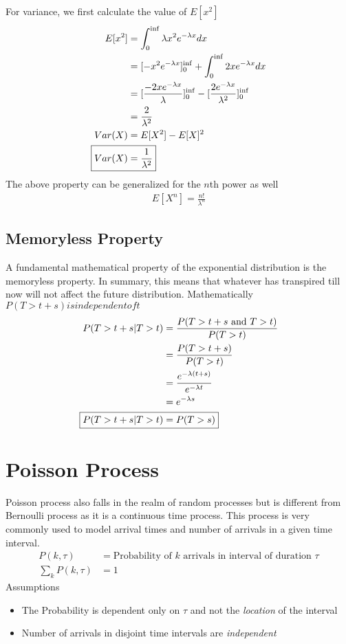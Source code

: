 \documentclass[../probability-notes.tex]{subfiles}
\begin{document}
    For variance, we first calculate the value of $E[x^{2}]$
    \begin{align*}
        E[x^{2}] &= \int_{0}^{\inf} \lambda x^{2} e^{-\lambda x} dx\\
        &= [-x^{2} e^{-\lambda x}]_{0}^{\inf} + \int_{0}^{\inf} 2x e^{-\lambda x} dx\\
        &= [\frac{-2x e^{-\lambda x}}{\lambda}]_{0}^{\inf} - [\frac{2e^{-\lambda x}}{\lambda^{2}}]_{0}^{\inf}\\
        &= \frac{2}{\lambda^{2}}\\
        Var(X) &= E[X^{2}] - E[X]^{2}\\
        \Aboxed{Var(X) &= \frac{1}{\lambda^{2}}}
    \end{align*}
    The above property can be generalized for the $n$th power as well
    \begin{align*}
        E[X^{n}] = \frac{n!}{\lambda^{n}}
    \end{align*}

    \subsection{Memoryless Property}
    A fundamental mathematical property of the exponential distribution is the memoryless property. In summary, this means that whatever has transpired till now will not affect the future distribution. Mathematically $P(T > t+s) is independent of t$
    \begin{align*}
        P(T > t+s | T>t) &= \frac{P(T> t+s \text{ and }T > t)}{P(T > t)}\\
        &= \frac{P(T > t + s)}{P(T > t)}\\
        &= \frac{e^{-\lambda(t+s)}}{e^{-\lambda t}}\\
        &= e^{-\lambda s}\\
        \Aboxed{P(T > t+s | T>t) &= P(T > s)}
    \end{align*}


    \section{Poisson Process}
    Poisson process also falls in the realm of random processes but is different from Bernoulli process as it is a continuous time process. This process is very commonly used to model arrival times and number of arrivals in a given time interval.
    \begin{align*}
        P(k, \tau) &= \text{Probability of $k$ arrivals in interval of duration $\tau$}\\
        \sum_{k} P(k, \tau) &= 1 \tag*{for a given $\tau$}
    \end{align*}
    Assumptions
    \begin{itemize}
        \item The Probability is dependent only on $\tau$ and not the \emph{location} of the interval
        \item Number of arrivals in disjoint time intervals are \emph{independent}
    \end{itemize}
    
\end{document}

